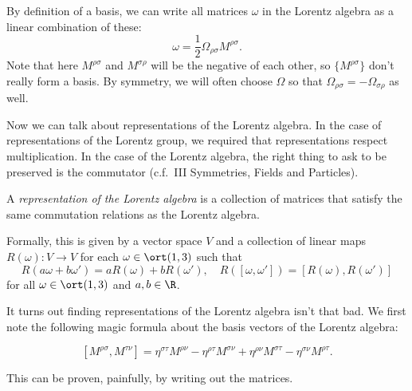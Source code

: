 \documentclass[a4paper]{article}
\begin{document}
By definition of a basis, we can write all matrices $\omega$ in the Lorentz algebra as a linear combination of these:
\[
  \omega = \frac{1}{2} \Omega_{\rho\sigma}M^{\rho\sigma}.
\]
Note that here $M^{\rho\sigma}$ and $M^{\sigma\rho}$ will be the negative of each other, so $\{M^{\rho\sigma}\}$ don't really form a basis. By symmetry, we will often choose $\Omega$ so that $\Omega_{\rho\sigma} = - \Omega_{\sigma \rho}$ as well.

Now we can talk about representations of the Lorentz algebra. In the case of representations of the Lorentz group, we required that representations respect multiplication. In the case of the Lorentz algebra, the right thing to ask to be preserved is the commutator (c.f.\ III Symmetries, Fields and Particles).
\begin{defi}
  A \emph{representation of the Lorentz algebra} is a collection of matrices that satisfy the same commutation relations as the Lorentz algebra.

  Formally, this is given by a vector space $V$ and a collection of linear maps $R(\omega): V \to V$ for each $\omega \in \ort(1, 3)$ such that
  \[
    R(a \omega + b\omega') = aR(\omega) + bR(\omega'),\quad R([\omega, \omega']) = [R(\omega), R(\omega')]
  \]
  for all $\omega \in \ort(1, 3)$ and $a, b \in \R$.

\end{defi}
It turns out finding representations of the Lorentz algebra isn't that bad. We first note the following magic formula about the basis vectors of the Lorentz algebra:
\begin{prop}
  \[
    [M^{\rho\sigma}, M^{\tau\nu}] = \eta^{\sigma\tau} M^{\rho\nu} - \eta^{\rho\tau} M^{\sigma\nu} + \eta^{\rho\nu}M^{\sigma\tau} - \eta^{\sigma\nu}M^{\rho\tau}.
  \]
\end{prop}
This can be proven, painfully, by writing out the matrices.
\end{document}

